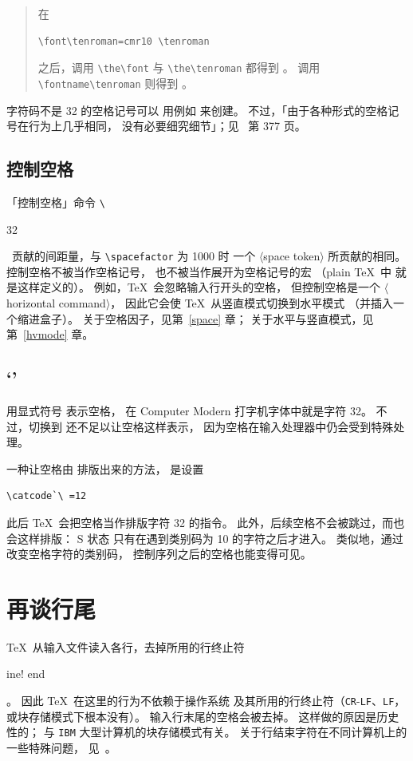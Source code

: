 \documentclass[a4paper]{rapport3}
\makeatletter
\def\gr#1{$\langle$#1$\rangle$}\def\key#1{{\tt#1}}
\newenvironment{example}{\begin{quotation}}{\end{quotation}}
\def\term#1\par{\index{#1}}
\def\cstoidx#1\par{\index{#1@\cs{#1}}}
\makeatother
\begin{document}
\begin{example} 在
\begin{verbatim}
\font\tenroman=cmr10 \tenroman
\end{verbatim}
之后，调用 \verb>\the\font> 与 \verb>\the\tenroman> 都得到 。
调用 \verb>\fontname\tenroman> 则得到 。
\end{example}

字符码不是 32 的空格记号可以
用例如  来创建。
不过，「由于各种形式的空格记号在行为上几乎相同，
没有必要细究细节」；见~\cite{Knuth:TeXbook} 第 377 页。


\subsection{控制空格}

「控制空格」命令 \verb-\-
\cstoidx\char32\par\
贡献的间距量，与 \verb=\spacefactor= 为 1000 时
一个 \gr{space token} 所贡献的相同。
控制空格不被当作空格记号，
也不被当作展开为空格记号的宏
（plain \TeX\ 中  就是这样定义的）。
例如，\TeX\ 会忽略输入行开头的空格，
但控制空格是一个 \gr{horizontal command}，
因此它会使 \TeX\ 从竖直模式切换到水平模式
（并插入一个缩进盒子）。
关于空格因子，见第~\ref{space} 章；
关于水平与竖直模式，见第~\ref{hvmode} 章。

\subsection{`\n{\char32}'}

用显式符号  表示空格，
在 Computer Modern 打字机字体中就是字符 32。
不过，切换到  还不足以让空格这样表示，
因为空格在输入处理器中仍会受到特殊处理。

一种让空格由  排版出来的方法，
是设置 \begin{verbatim}
\catcode`\ =12
\end{verbatim}
此后 \TeX\ 会把空格当作排版字符 32 的指令。
此外，后续空格不会被跳过，而也会这样排版：
{\italic S} 状态
\awp
只有在遇到类别码为 10 的字符之后才进入。
类似地，通过改变空格字符的类别码，
控制序列之后的空格也能变得可见。

\section{再谈行尾}

\TeX\ 从输入文件读入各行，去掉所用的行终止符\term line! end\par。
因此 \TeX\ 在这里的行为不依赖于操作系统
及其所用的行终止符（\key{CR}-\key{LF}、\key{LF}，
或块存储模式下根本没有）。
输入行末尾的空格会被去掉。
这样做的原因是历史性的；
与 \key{IBM} 大型计算机的块存储模式有关。
关于行结束字符在不同计算机上的一些特殊问题，
见~\cite{B:ctrl-M}。
\end{document}
